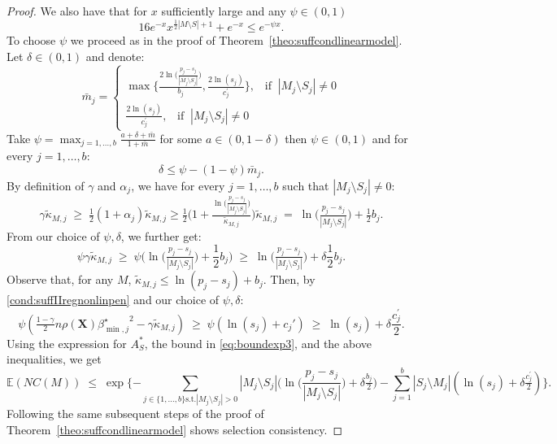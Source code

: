 \documentclass[aos]{imsart}
\theoremstyle{plain}
\newcommand{\E}{\mathbb{E}}
\newcommand{\bs}{\boldsymbol}
\begin{document}
\begin{proof}
We also have that for $x$ sufficiently large and any $\psi \in (0,1)$
\begin{equation}\label{eq:boundexp3}
16e^{-x}x^{\tfrac12|M\setminus S|+1}+e^{-x}\leq e^{-\psi x}.    
\end{equation}
To choose $\psi$ we proceed as in the proof of Theorem~\ref{theo:suffcondlinearmodel}. Let $\delta \in (0,1)$ and denote:
$$\bar{m}_j=\begin{cases}
    \max\bigg\{\tfrac{2\ln\big(\tfrac{p_j-s_j}{|M_j\setminus S_j|}\big)}{b_{j}},\tfrac{2\ln(s_j)}{c^{\prime}_{j}}\bigg\},\;\;\; \text{if}\;\;|M_j \setminus S_j| \neq 0 \\
    \frac{2\ln(s_j)}{c^{\prime}_{j}},\;\;\; \text{if}\;\;|M_j \setminus S_j| \neq 0
\end{cases}$$
Take $\psi=\max_{j=1, \ldots,b}\frac{a + \delta + \bar{m}}{1+\bar{m}}$ for some $a \in(0, 1- \delta)$ then $\psi \in (0,1)$ and for every $j=1,\ldots,b$:
$$\delta \leq \psi-(1-\psi)\bar{m}_j.$$ 
By definition of $\gamma$ and $\alpha_j$, we have for every $j=1,\ldots,b$ such that $|M_j \setminus S_j|\neq0$:
$$
\gamma\tilde{\kappa}_{M, j}\;\geq\;\tfrac12 (1+\alpha_j)\tilde{\kappa}_{M, j}\geq \tfrac12 \bigg(1+\tfrac{\ln\big(\tfrac{p_j-s_j}{|M_j\setminus S_j|}\big)}{\tilde{\kappa}_{M, j}}\bigg)\tilde{\kappa}_{M, j} \;=\; \ln\big(\tfrac{p_j-s_j}{|M_j\setminus S_j|}\big)+ \tfrac12b_{j}.
$$
From our choice of $\psi,\delta$, we further get:
$$\psi\gamma\tilde{\kappa}_{M, j} \;\geq\; \psi\bigg(\ln\big(\tfrac{p_j-s_j}{|M_j\setminus S_j|}\big)+ \frac12b_{j}\bigg) \;\geq\; \ln\big(\tfrac{p_j-s_j}{|M_j\setminus S_j|}\big)+ \delta\frac12b_{j}.$$
Observe that, for any $M$, $\tilde{\kappa}_{M, j} \leq \ln(p_j-s_j)+b_j$. Then, by \eqref{cond:suffIIregnonlinpen} and our choice of $\psi,\delta$:
$$\psi\left(\tfrac{1-\gamma}{2} n \rho(\bs X) {\beta^{\star}_{\min,j}}^{2} - \gamma\tilde{\kappa}_{M, j}\right) \;\geq\; \psi\left(\ln(s_j)+c_j'\right) \;\geq\; \ln(s_j)+\delta \frac{c^{\prime}_j}{2}.
$$
Using the expression for $A_S^*$, the bound in \eqref{eq:boundexp3}, and the above inequalities, we get
$$
\E(NC(M))\;\leq\;\exp\{- \sum_{j \in \{1,\ldots, b\} \text{s.t.} |M_j \setminus S_j| > 0} |M_j\setminus S_j|\bigg(\ln\bigg(\frac{p_j-s_j}{|M_j\setminus S_j|}\bigg)+\delta \tfrac{b_j}{2}\bigg)-\sum_{j=1}^b |S_j\setminus M_j|(\ln(s_j)+\delta \tfrac{c^{\prime}_j}{2})\}.
$$
Following the same subsequent steps of the proof of Theorem~\ref{theo:suffcondlinearmodel} shows selection consistency.
\end{proof}
\end{document}
